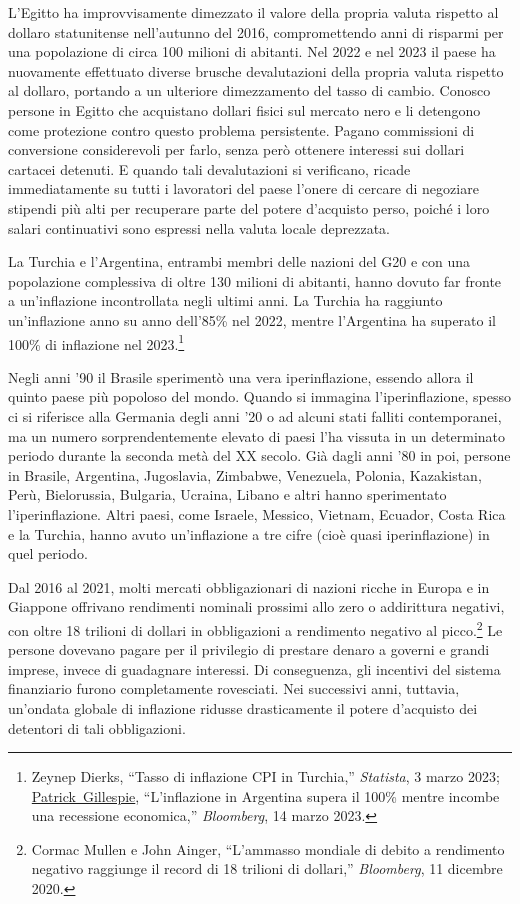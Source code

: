 \documentclass[
  a5paper,
  smalldemyvopaper,10pt,twoside,onecolumn,openright,extrafontsizes,hidelinks]{memoir}
\begin{document}
L'Egitto ha improvvisamente dimezzato il valore della propria valuta
rispetto al dollaro statunitense nell'autunno del 2016, compromettendo
anni di risparmi per una popolazione di circa 100 milioni di abitanti.
Nel 2022 e nel 2023 il paese ha nuovamente effettuato diverse brusche
devalutazioni della propria valuta rispetto al dollaro, portando a un
ulteriore dimezzamento del tasso di cambio. Conosco persone in Egitto
che acquistano dollari fisici sul mercato nero e li detengono come
protezione contro questo problema persistente. Pagano commissioni di
conversione considerevoli per farlo, senza però ottenere interessi sui
dollari cartacei detenuti. E quando tali devalutazioni si verificano,
ricade immediatamente su tutti i lavoratori del paese l'onere di cercare
di negoziare stipendi più alti per recuperare parte del potere
d'acquisto perso, poiché i loro salari continuativi sono espressi nella
valuta locale deprezzata.

La Turchia e l'Argentina, entrambi membri delle nazioni del G20 e con
una popolazione complessiva di oltre 130 milioni di abitanti, hanno
dovuto far fronte a un'inflazione incontrollata negli ultimi anni. La
Turchia ha raggiunto un'inflazione anno su anno dell'85\% nel 2022,
mentre l'Argentina ha superato il 100\% di inflazione nel
2023.\footnote{Zeynep Dierks, ``Tasso di inflazione CPI in Turchia,''
  \emph{Statista}, 3 marzo 2023;
  \href{https://www.bloomberg.com/authors/ATpJM4rxzpI/patrick-gillespie}{Patrick~Gillespie},
  ``L'inflazione in Argentina supera il 100\% mentre incombe una
  recessione economica,'' \emph{Bloomberg}, 14 marzo 2023.}

Negli anni '90 il Brasile sperimentò una vera iperinflazione, essendo
allora il quinto paese più popoloso del mondo. Quando si immagina
l'iperinflazione, spesso ci si riferisce alla Germania degli anni '20 o
ad alcuni stati falliti contemporanei, ma un numero sorprendentemente
elevato di paesi l'ha vissuta in un determinato periodo durante la
seconda metà del XX secolo. Già dagli anni '80 in poi, persone in
Brasile, Argentina, Jugoslavia, Zimbabwe, Venezuela, Polonia,
Kazakistan, Perù, Bielorussia, Bulgaria, Ucraina, Libano e altri hanno
sperimentato l'iperinflazione. Altri paesi, come Israele, Messico,
Vietnam, Ecuador, Costa Rica e la Turchia, hanno avuto un'inflazione a
tre cifre (cioè quasi iperinflazione) in quel periodo.

Dal 2016 al 2021, molti mercati obbligazionari di nazioni ricche in
Europa e in Giappone offrivano rendimenti nominali prossimi allo zero o
addirittura negativi, con oltre 18 trilioni di dollari in obbligazioni a
rendimento negativo al picco.\footnote{Cormac Mullen e John Ainger,
  ``L'ammasso mondiale di debito a rendimento negativo raggiunge il
  record di 18 trilioni di dollari,'' \emph{Bloomberg}, 11 dicembre
  2020.} Le persone dovevano pagare per il privilegio di prestare denaro
a governi e grandi imprese, invece di guadagnare interessi. Di
conseguenza, gli incentivi del sistema finanziario furono completamente
rovesciati. Nei successivi anni, tuttavia, un'ondata globale di
inflazione ridusse drasticamente il potere d'acquisto dei detentori di
tali obbligazioni.
\end{document}
